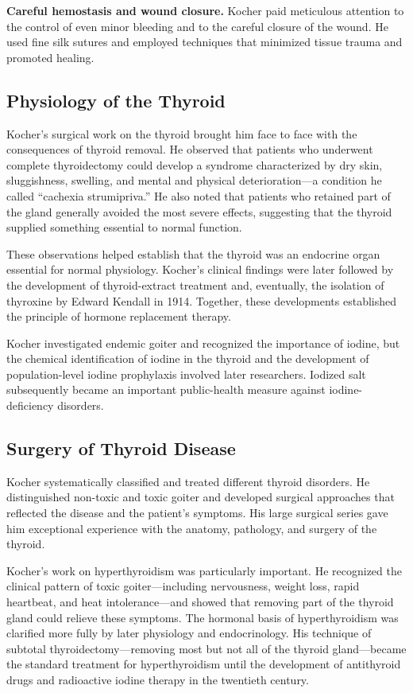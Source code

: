 \textbf{Careful hemostasis and wound closure.} Kocher paid meticulous attention to the control of even minor bleeding and to the careful closure of the wound. He used fine silk sutures and employed techniques that minimized tissue trauma and promoted healing.

\subsection{Physiology of the Thyroid}

Kocher's surgical work on the thyroid brought him face to face with the consequences of thyroid removal. He observed that patients who underwent complete thyroidectomy could develop a syndrome characterized by dry skin, sluggishness, swelling, and mental and physical deterioration---a condition he called ``cachexia strumipriva.'' He also noted that patients who retained part of the gland generally avoided the most severe effects, suggesting that the thyroid supplied something essential to normal function.\cite{thyroid-physiology}

These observations helped establish that the thyroid was an endocrine organ essential for normal physiology. Kocher's clinical findings were later followed by the development of thyroid-extract treatment and, eventually, the isolation of thyroxine by Edward Kendall in 1914. Together, these developments established the principle of hormone replacement therapy.\cite{thyroid-physiology}

Kocher investigated endemic goiter and recognized the importance of iodine, but the chemical identification of iodine in the thyroid and the development of population-level iodine prophylaxis involved later researchers. Iodized salt subsequently became an important public-health measure against iodine-deficiency disorders.\cite{who-iodine}

\subsection{Surgery of Thyroid Disease}

Kocher systematically classified and treated different thyroid disorders. He distinguished non-toxic and toxic goiter and developed surgical approaches that reflected the disease and the patient's symptoms. His large surgical series gave him exceptional experience with the anatomy, pathology, and surgery of the thyroid.

Kocher's work on hyperthyroidism was particularly important. He recognized the clinical pattern of toxic goiter---including nervousness, weight loss, rapid heartbeat, and heat intolerance---and showed that removing part of the thyroid gland could relieve these symptoms. The hormonal basis of hyperthyroidism was clarified more fully by later physiology and endocrinology. His technique of subtotal thyroidectomy---removing most but not all of the thyroid gland---became the standard treatment for hyperthyroidism until the development of antithyroid drugs and radioactive iodine therapy in the twentieth century.

